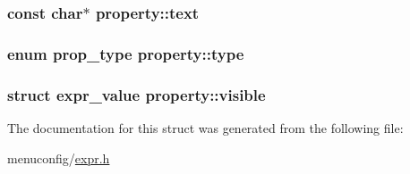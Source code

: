 \hypertarget{structproperty_ac2743f21c2a2d7b7f79b0cee7dd1c313}{
\subsubsection[{text}]{\setlength{\rightskip}{0pt plus 5cm}const char$\ast$ property\-::text}}\label{structproperty_ac2743f21c2a2d7b7f79b0cee7dd1c313}
\hypertarget{structproperty_ad06376f6f75b5fb29e9066735fac4348}{
\subsubsection[{type}]{\setlength{\rightskip}{0pt plus 5cm}enum {\bf prop\-\_\-type} property\-::type}}\label{structproperty_ad06376f6f75b5fb29e9066735fac4348}
\hypertarget{structproperty_aa7da8f1af39de7702324ef8d64554ea5}{
\subsubsection[{visible}]{\setlength{\rightskip}{0pt plus 5cm}struct {\bf expr\-\_\-value} property\-::visible}}\label{structproperty_aa7da8f1af39de7702324ef8d64554ea5}


The documentation for this struct was generated from the following file\-:\begin{DoxyCompactItemize}
\item 
menuconfig/\hyperlink{expr_8h}{expr.\-h}\end{DoxyCompactItemize}
